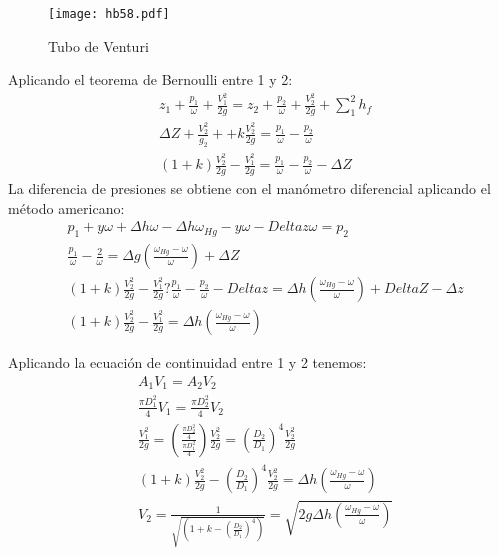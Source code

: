 \begin{figure}[h!]
    \centering
      \texttt{[image: hb58.pdf]}
      \caption{Tubo de Venturi}
      \label{hb58}
    \end{figure}
    
    Aplicando el teorema de Bernoulli entre 1 y 2:
    \begin{align*}
        &z_1+ \frac{p_1}{\omega} + \frac{V_1^2}{2g} = z_2 + \frac{p_2}{\omega} + \frac{V^{2}_2}{2g} +\sum_1^2 h_f\\
        &\Delta Z + \frac{V_2^2}{g_2} + + k \frac{V_2^2}{2g} = \frac{p_1}{\omega} - \frac{p_2}{\omega} \\
        &(1 + k) \frac{V_2^2}{2g} - \frac{V_1^2}{2g} = \frac{p_1}{\omega} - \frac{p_2}{\omega} - \Delta Z
    \end{align*}
    La diferencia de presiones se obtiene con el manómetro diferencial aplicando el método americano:
    \begin{align*}
        &p_1 + y\omega +\Delta h\omega -\Delta h\omega_{Hg} - y\omega - Delta z\omega = p_2\\
        &\frac{p_1}{\omega} - \frac{2}{\omega} =\Delta g\left(\frac{\omega_{Hg} -\omega}{\omega}\right) +\Delta Z\\
        &(1 + k)\frac{V_2^2}{2g} - \frac{V_1^2}{2g}?\frac{p_1}{\omega} - \frac{p_2}{\omega} - Delta z =\Delta h\left(\frac{\omega_{Hg} -\omega}{\omega}\right) + Delta Z -\Delta z\\
        &(1 + k) \frac{V_2^2}{2g} - \frac{V_1^2}{2g} =\Delta h\left(\frac{\omega_{Hg} -\omega}{\omega}\right)
    \end{align*}
    
    Aplicando la ecuación de continuidad entre 1 y 2 tenemos:
    \begin{align*}
        &A_1V_1 = A_2V_2\\
        &\frac{\pi D_1^2}{4}V_1 = \frac{\pi D_2^2}{4}V_2\\
        &\frac{V_1^2}{2g} =\left(\frac{\frac{\pi D_2^2}{4}}{\frac{\pi D_1^2}{4}  }\right)\frac{V_2^2}{2g} =\left(\frac{D_2}{D_1}\right)^4\frac{V_2^2}{2g}\\
        &(1 + k)\frac{V_2^2}{2g} -\left(\frac{D_2}{D_1}\right)^{4}\frac{V_2^2}{2g} =\Delta h\left(\frac{\omega_{Hg} -\omega}{\omega}\right)\\
        &V_2 =\frac{1}{\sqrt{\left(1 + k -\left(\frac{D_2}{D_1}\right)^4\right)}} = \sqrt{2g\Delta h\left(\frac{\omega_{Hg} -\omega}{\omega}\right)}
    \end{align*}

